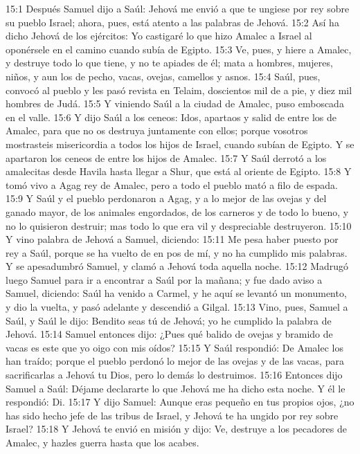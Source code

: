 15:1 Después Samuel dijo a Saúl: Jehová me envió a que te ungiese por rey sobre su pueblo Israel; ahora, pues, está atento a las palabras de Jehová.  
15:2 Así ha dicho Jehová de los ejércitos: Yo castigaré lo que hizo Amalec a Israel al oponérsele en el camino cuando subía de Egipto. 
15:3 Ve, pues, y hiere a Amalec, y destruye todo lo que tiene, y no te apiades de él; mata a hombres, mujeres, niños, y aun los de pecho, vacas, ovejas, camellos y asnos.  
15:4 Saúl, pues, convocó al pueblo y les pasó revista en Telaim, doscientos mil de a pie, y diez mil hombres de Judá.  
15:5 Y viniendo Saúl a la ciudad de Amalec, puso emboscada en el valle.  
15:6 Y dijo Saúl a los ceneos: Idos, apartaos y salid de entre los de Amalec, para que no os destruya juntamente con ellos; porque vosotros mostrasteis misericordia a todos los hijos de Israel, cuando subían de Egipto. Y se apartaron los ceneos de entre los hijos de Amalec.  
15:7 Y Saúl derrotó a los amalecitas desde Havila hasta llegar a Shur, que está al oriente de Egipto.  
15:8 Y tomó vivo a Agag rey de Amalec, pero a todo el pueblo mató a filo de espada.  
15:9 Y Saúl y el pueblo perdonaron a Agag, y a lo mejor de las ovejas y del ganado mayor, de los animales engordados, de los carneros y de todo lo bueno, y no lo quisieron destruir; mas todo lo que era vil y despreciable destruyeron.  
15:10 Y vino palabra de Jehová a Samuel, diciendo:  
15:11 Me pesa haber puesto por rey a Saúl, porque se ha vuelto de en pos de mí, y no ha cumplido mis palabras. Y se apesadumbró Samuel, y clamó a Jehová toda aquella noche.  
15:12 Madrugó luego Samuel para ir a encontrar a Saúl por la mañana; y fue dado aviso a Samuel, diciendo: Saúl ha venido a Carmel, y he aquí se levantó un monumento, y dio la vuelta, y pasó adelante y descendió a Gilgal.  
15:13 Vino, pues, Samuel a Saúl, y Saúl le dijo: Bendito seas tú de Jehová; yo he cumplido la palabra de Jehová.  
15:14 Samuel entonces dijo: ¿Pues qué balido de ovejas y bramido de vacas es este que yo oigo con mis oídos?  
15:15 Y Saúl respondió: De Amalec los han traído; porque el pueblo perdonó lo mejor de las ovejas y de las vacas, para sacrificarlas a Jehová tu Dios, pero lo demás lo destruimos.  
15:16 Entonces dijo Samuel a Saúl: Déjame declararte lo que Jehová me ha dicho esta noche. Y él le respondió: Di.  
15:17 Y dijo Samuel: Aunque eras pequeño en tus propios ojos, ¿no has sido hecho jefe de las tribus de Israel, y Jehová te ha ungido por rey sobre Israel?  
15:18 Y Jehová te envió en misión y dijo: Ve, destruye a los pecadores de Amalec, y hazles guerra hasta que los acabes.  
